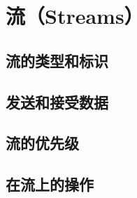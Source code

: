 \section{流（Streams）}
\subsection{流的类型和标识}
\subsection{发送和接受数据}
\subsection{流的优先级}
\subsection{在流上的操作}